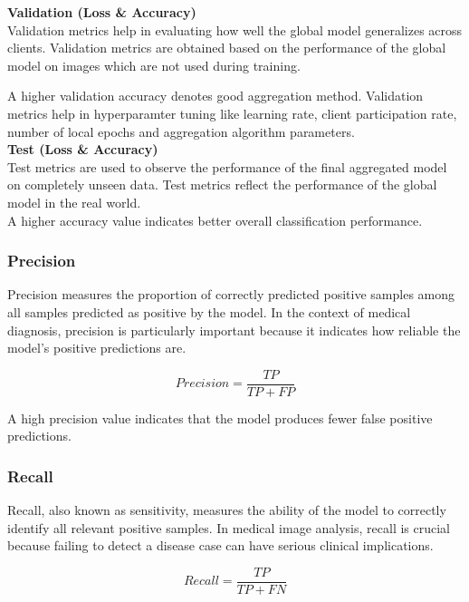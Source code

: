 \documentclass[12pt]{book}
\begin{document}
\textbf{Validation (Loss \& Accuracy)}\\
Validation metrics help in evaluating how well the global model generalizes across clients. Validation metrics are obtained based on the performance of the global model on images which are not used during training.

A higher validation accuracy denotes good aggregation method.
Validation metrics help in hyperparamter tuning like learning rate, client participation rate, number of local epochs and aggregation algorithm parameters.
\\

\textbf{Test (Loss \& Accuracy)}\\
Test metrics are used to observe the performance of the final aggregated model on completely unseen data. Test metrics reflect the performance of the global model in the real world.\\




A higher accuracy value indicates better overall classification performance.

\subsubsection{Precision}

Precision measures the proportion of correctly predicted positive samples among all samples predicted as positive by the model. In the context of medical diagnosis, precision is particularly important because it indicates how reliable the model's positive predictions are.

\begin{equation}
Precision = \frac{TP}{TP + FP}
\end{equation}

A high precision value indicates that the model produces fewer false positive predictions.

\subsubsection{Recall}

Recall, also known as sensitivity, measures the ability of the model to correctly identify all relevant positive samples. In medical image analysis, recall is crucial because failing to detect a disease case can have serious clinical implications.

\begin{equation}
Recall = \frac{TP}{TP + FN}
\end{equation}
\end{document}
